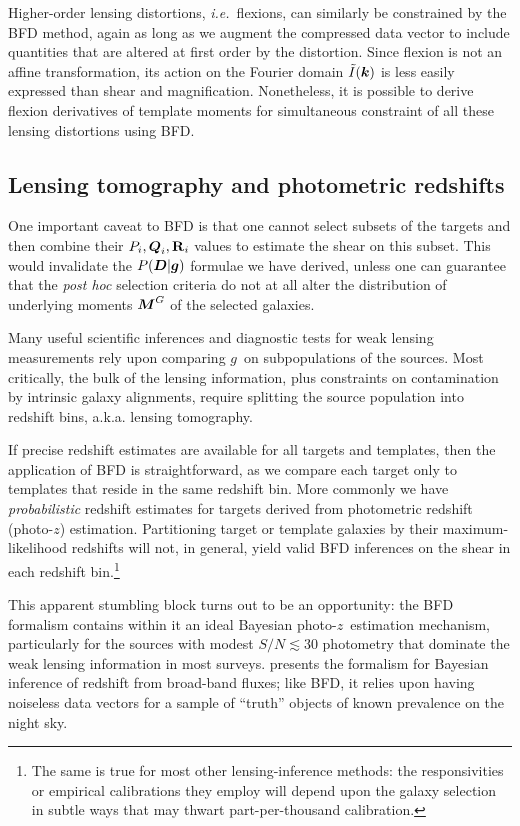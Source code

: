 \documentclass[11pt,preprint,flushrt]{aastex}
\newcommand\ie{{\it i.e.\/}}
\newcommand{\vecD}{\mbox{\boldmath $D$}}
\newcommand{\vecg}{\mbox{\boldmath $g$}}
\newcommand{\vecM}{\mbox{\boldmath $M$}}
\newcommand{\vecQ}{\mbox{\boldmath $Q$}}
\newcommand{\veck}{\mbox{\boldmath $k$}}
\newcommand{\matR}{\mbox{$\bf R$}}
\newcommand{\photoz}{photo-$z$}
\begin{document}
 Higher-order lensing distortions, \ie\ flexions, can similarly be
constrained by the BFD method, again as long as we augment the
compressed data vector to include quantities that are altered at first
order by the distortion.  Since flexion is not an affine
transformation, its action on the Fourier domain $\tilde I(\veck)$ is
less easily expressed than shear and magnification.  Nonetheless, it is
possible to derive flexion derivatives of template moments for
simultaneous constraint of all these lensing distortions using BFD.

\subsection{Lensing tomography and photometric redshifts}
One important caveat to BFD is that one cannot select subsets of
the targets and then combine their $P_i,\vecQ_i,\matR_i$ values to
estimate the shear on this subset.  This would
invalidate the $P(\vecD | \vecg)$ formulae we have derived, unless
one can guarantee that the {\it post hoc} selection criteria do not at
all alter the distribution of underlying moments $\vecM^G$ of the
selected galaxies.

Many useful scientific inferences and diagnostic tests for weak
lensing measurements rely upon comparing \vecg\ on
subpopulations of the sources.  Most critically, the bulk of the
lensing information, plus constraints on contamination by
intrinsic galaxy alignments, require splitting the source population
into redshift bins, a.k.a. lensing tomography.

If precise redshift estimates are available for all targets and
templates, then the application of BFD is straightforward, as we
compare each target only to templates that reside in the same redshift
bin.  More commonly we have \emph{probabilistic} redshift estimates
for targets derived from photometric redshift (\photoz) estimation.
Partitioning target or template galaxies by their maximum-likelihood redshifts will
not, in general, yield valid BFD inferences on the shear in each redshift
bin.\footnote{The same is true
  for most other lensing-inference methods: the responsivities or
  empirical calibrations they employ will depend upon the galaxy
  selection in subtle ways that may thwart part-per-thousand calibration.}

This apparent stumbling block turns out to be an opportunity: the BFD
formalism contains within it an ideal Bayesian \photoz\ estimation
mechanism, particularly for the sources with modest
$S/N\lesssim30$ photometry that dominate the weak lensing information
in most surveys. \citet{BPZ} presents the formalism for Bayesian
inference of redshift from broad-band fluxes; like BFD, it relies upon
having noiseless data vectors for a sample of ``truth'' objects of
known prevalence on the night sky.
\end{document}
